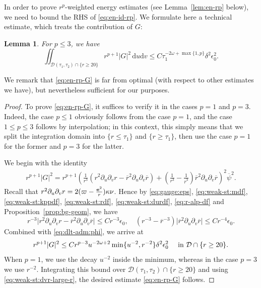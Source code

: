 \documentclass[10pt, reqno]{amsart}
\newtheorem{lemma}[theorem]{Lemma}
\theoremstyle{definition}
\theoremstyle{remark}
\theoremstyle{conjecture}
\numberwithin{equation}{section}
\newcommand{\abs}[1]{\vert#1\vert}
\newcommand{\set}[1]{\{#1\}}
\newcommand{\ud}{\mathrm{d}}
\newcommand{\rd}{\partial}
\newcommand{\0}{\emptyset}
\newcommand{\dlt}{\delta}
\newcommand{\eps}{\epsilon}
\newcommand{\kpp}{\kappa}
\newcommand{\omg}{\omega}
\newcommand{\bfe}{{\bf e}}
\newcommand{\calD}{\mathcal D}
\newcommand{\dur}{\nu}
\newcommand{\e}{\bfe}							%
\newcommand{\psibg}{\overline{\psi}}				%
\newcommand{\rbg}{\overline{r}}					%
\begin{document}
In order to prove $r^{p}$-weighted energy estimates (see Lemma~\ref{lem:en-rp} below), we need to bound the RHS of \eqref{eq:en-id-rp}. We formulate here a technical estimate, which treats the contribution of $G$:
\begin{lemma} \label{lem:en-rp-G}
For $p \leq 3$, we have
\begin{equation} \label{eq:en-rp-G}
\iint_{\calD(\tau_{1}, \tau_{2}) \cap \set{r \geq 20}} r^{p+1} \abs{G}^{2} \, \ud u \ud v \leq C \tau_{1}^{-2 \omg + \max \set{1, p}} \dlt^{2}\eps_{0}^{2}.
\end{equation}
\end{lemma}
We remark that \eqref{eq:en-rp-G} is far from optimal (with respect to other estimates we have), but nevertheless sufficient for our purposes.
\begin{proof}
To prove \eqref{eq:en-rp-G}, it suffices to verify it in the cases $p = 1$ and $p = 3$. Indeed, the case $p \leq 1$ obviously follows from the case $p = 1$, and the case $1 \leq p \leq 3$ follows by interpolation; in this context, this simply means that we split the integration domain into $\set{r \leq \tau_{1}}$ and $\set{r \geq \tau_{1}}$, then use the case $p = 1$ for the former and $p = 3$ for the latter.

We begin with the identity
\begin{align*}
	r^{p+1} \abs{G}^{2}
	= r^{p+1} \left(\frac{1}{r^{3}} (r^{2} \rd_{u} \rd_{v} r - \rbg^{2} \rd_{u} \rd_{v} \rbg) + \left(\frac{1}{r^{3}} - \frac{1}{\rbg^{3}}\right) \rbg^{2} \rd_{u} \rd_{v} \rbg \right)^{2} \psibg^{2}.
\end{align*}
Recall that $r^{2} \rd_{u} \rd_{v} r = 2 (\varpi - \frac{\e^{2}}{r}) \kpp \dur$. Hence by \eqref{eq:gauge:eps}, \eqref{eq:weak-st:mdf}, \eqref{eq:weak-st:kppdf}, \eqref{eq:weak-st:rdf}, \eqref{eq:weak-st:durdf}, \eqref{eq:r-alp-df} and Proposition~\ref{prop:bg-geom}, we have
\begin{equation*}
	r^{-3} \abs{r^{2} \rd_{u} \rd_{v} r - \rbg^{2} \rd_{u} \rd_{v} \rbg} \leq C r^{-3} \eps_{0}, \quad
	(r^{-3} - \rbg^{-3}) \abs{\rbg^{2} \rd_{u} \rd_{v} \rbg} \leq C r^{-4} \eps_{0}.
\end{equation*}
Combined with \eqref{eq:dlt-adm:phi}, we arrive at
\begin{equation*}
	r^{p+1} \abs{G}^{2} \leq C r^{p-3} u^{-2 \omg + 2} \min\set{u^{-2}, r^{-2}}\dlt^{2} \eps_{0}^{2} \quad \hbox{ in } \calD \cap \set{r \geq 20}.
\end{equation*}
When $p = 1$, we use the decay $u^{-2}$ inside the minimum, whereas in the case $p = 3$ we use $r^{-2}$. Integrating this bound over $\calD(\tau_{1}, \tau_{2}) \cap \set{r \geq 20}$ and using \eqref{eq:weak-st:dvr-large-r}, the desired estimate \eqref{eq:en-rp-G} follows. \qedhere
\end{proof}
\end{document}
